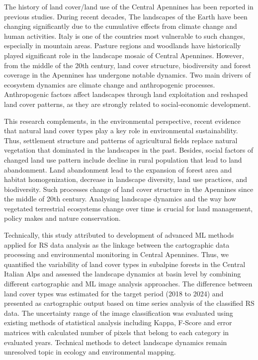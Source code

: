 \documentclass[jimaging,article,accept,pdftex,oneauthor]{Definitions/mdpi}
\begin{document}
The history of land cover/land use of the Central Apennines has been reported in previous studies. During recent decades, The landscapes of the Earth have been changing significantly due to the cumulative effects from climate change and human activities. Italy is one of the countries most vulnerable to such changes, especially in mountain areas. Pasture regions and woodlands have historically played significant role in the landscape mosaic of Central Apennines. However, from the middle of the 20th century, land cover structure, biodiversity and forest coverage in the Apennines has undergone notable dynamics. Two main drivers of ecosystem dynamics are climate change and anthropogenic processes. Anthropogenic factors affect landscapes through land exploitation and reshaped land cover patterns, as they are strongly related to social-economic development. 

{This research complements, in the environmental perspective, recent evidence that natural land cover types play a key role in environmental sustainability. Thus, settlement} structure and patterns of agricultural fields replace natural vegetation that dominated in the landscapes in the past. Besides, social factors of changed land use pattern include decline in rural population that lead to land abandonment. Land abandonment lead to the expansion of forest area and habitat homogenization, decrease in landscape diversity, land use practices, and biodiversity. Such processes change of land cover structure in the Apennines since the middle of 20th century. {Analysing landscape dynamics and  the way how vegetated terrestrial ecosystems change over time is crucial for land management, policy makes and nature conservation.}

{Technically, this study attributed to development of advanced ML methods applied for RS data analysis as the linkage between the cartographic data processing and environmental monitoring in Central Apennines. Thus, we quantified the variability of land cover types in subalpine forests in the Central Italian Alps and assessed the landscape dynamics at basin level by combining different cartographic and ML image analysis approaches. The difference between land cover types was estimated for the target period (2018 to 2024) and presented as cartographic output based on time series analysis of the classified RS data. The uncertainty range of the image classification was evaluated using existing methods of statistical analysis including Kappa, F-Score and error matrices with calculated number of pixels that belong to each category in evaluated years. }Technical methods to detect{ }landscape dynamics remain unresolved topic in ecology and environmental mapping. 
\end{document}
